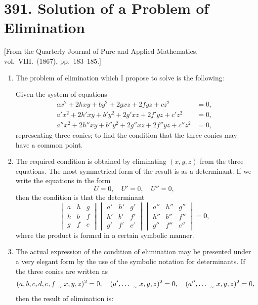 \documentclass[12pt,a4paper]{article}
\theoremstyle{plain}
\theoremstyle{definition}
\theoremstyle{remark}
\begin{document}
\section*{391. Solution of a Problem of Elimination}

\begin{center}
\small [From the Quarterly Journal of Pure and Applied Mathematics, vol.~VIII.\ (1867), pp.~183--185.]
\end{center}

\begin{enumerate}[label=\arabic*.]
\item The problem of elimination which I propose to solve is the following:

Given the system of equations
\begin{align*}
ax^2 + 2hxy + by^2 + 2gxz + 2fyz + cz^2 &= 0, \\
a'x^2 + 2h'xy + b'y^2 + 2g'xz + 2f'yz + c'z^2 &= 0, \\
a''x^2 + 2h''xy + b''y^2 + 2g''xz + 2f''yz + c''z^2 &= 0,
\end{align*}
representing three conics; to find the condition that the three conics may have a common point.

\item The required condition is obtained by eliminating $(x,y,z)$ from the three equations. The most symmetrical form of the result is as a determinant. If we write the equations in the form
\[U = 0, \quad U' = 0, \quad U'' = 0,\]
then the condition is that the determinant
\[\begin{vmatrix}
a & h & g \\
h & b & f \\
g & f & c
\end{vmatrix}
\begin{vmatrix}
a' & h' & g' \\
h' & b' & f' \\
g' & f' & c'
\end{vmatrix}
\begin{vmatrix}
a'' & h'' & g'' \\
h'' & b'' & f'' \\
g'' & f'' & c''
\end{vmatrix} = 0,\]
where the product is formed in a certain symbolic manner.

\item The actual expression of the condition of elimination may be presented under a very elegant form by the use of the symbolic notation for determinants. If the three conics are written as
\[
\resizebox{\textwidth}{!}{$\displaystyle (a,b,c,d,e,f \,\raisebox{-0.5ex}{\,\texttildelow\,}\, x,y,z)^2 = 0, \quad (a',\ldots \,\raisebox{-0.5ex}{\,\texttildelow\,}\, x,y,z)^2 = 0, \quad (a'',\ldots \,\raisebox{-0.5ex}{\,\texttildelow\,}\, x,y,z)^2 = 0, $}
\]
then the result of elimination is:


\end{enumerate}
\end{document}
